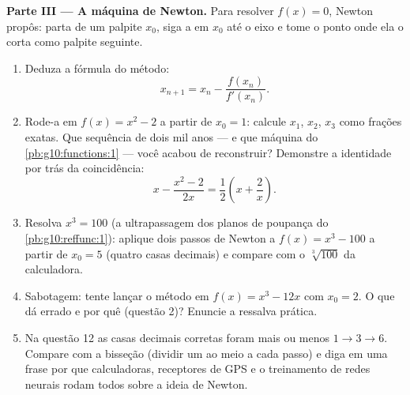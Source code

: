 \begin{problem}
\medskip
\noindent\textbf{Parte III --- A máquina de Newton.}
Para resolver $f(x) = 0$, Newton propôs: parta de um palpite
$x_0$, siga a  em $x_0$ até o eixo e tome o ponto onde
ela o corta como palpite seguinte.
\begin{enumerate}[resume]
  \item Deduza a fórmula do método:
        \[
        x_{n + 1} = x_n - \frac{f(x_n)}{f'(x_n)} .
        \]
  \item Rode-a em $f(x) = x^2 - 2$ a partir de $x_0 = 1$:
        calcule $x_1$, $x_2$, $x_3$ como frações exatas. Que
        sequência de dois mil anos --- e que máquina do
        \cref{pb:g10:functions:1} --- você acabou de
        reconstruir? Demonstre a identidade por trás da
        coincidência:
        \[
        x - \frac{x^2 - 2}{2x} = \frac12\left(x +
        \frac2x\right).
        \]
  \item Resolva $x^3 = 100$ (a ultrapassagem dos planos de
        poupança do \cref{pb:g10:reffunc:1}): aplique dois passos
        de Newton a $f(x) = x^3 - 100$ a partir de $x_0 = 5$
        (quatro casas decimais) e compare com o
        $\sqrt[3]{100}$ da calculadora.
  \item Sabotagem: tente lançar o método em $f(x) = x^3 - 12x$
        com $x_0 = 2$. O que dá errado e por quê (questão 2)?
        Enuncie a ressalva prática.
  \item Na questão 12 as casas decimais corretas foram mais ou
        menos $1 \to 3 \to 6$. Compare com a bisseção (dividir um
         ao meio a cada passo) e diga em uma frase por
        que calculadoras, receptores de GPS e o treinamento de
        redes neurais rodam todos sobre a ideia de Newton.
\end{enumerate}


\end{problem}
